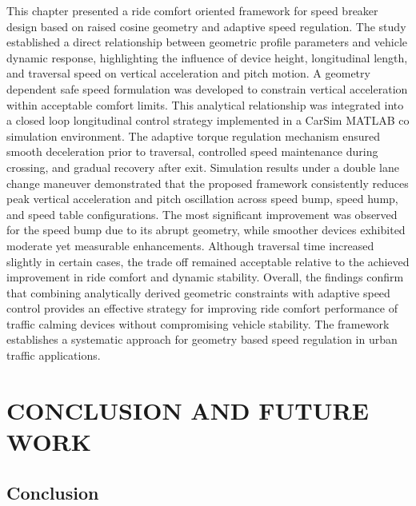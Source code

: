 \documentclass[a4paper,12pt,one side]{report}
\theoremstyle{definition}
\begin{document}
\begin{itemize}
This chapter presented a ride comfort oriented framework for speed breaker design based on raised cosine geometry and adaptive speed regulation. The study established a direct relationship between geometric profile parameters and vehicle dynamic response, highlighting the influence of device height, longitudinal length, and traversal speed on vertical acceleration and pitch motion. A geometry dependent safe speed formulation was developed to constrain vertical acceleration within acceptable comfort limits. This analytical relationship was integrated into a closed loop longitudinal control strategy implemented in a CarSim MATLAB co simulation environment. The adaptive torque regulation mechanism ensured smooth deceleration prior to traversal, controlled speed maintenance during crossing, and gradual recovery after exit. Simulation results under a double lane change maneuver demonstrated that the proposed framework consistently reduces peak vertical acceleration and pitch oscillation across speed bump, speed hump, and speed table configurations. The most significant improvement was observed for the speed bump due to its abrupt geometry, while smoother devices exhibited moderate yet measurable enhancements. Although traversal time increased slightly in certain cases, the trade off remained acceptable relative to the achieved improvement in ride comfort and dynamic stability. Overall, the findings confirm that combining analytically derived geometric constraints with adaptive speed control provides an effective strategy for improving ride comfort performance of traffic calming devices without compromising vehicle stability. The framework establishes a systematic approach for geometry based speed regulation in urban traffic applications.
\chapter{CONCLUSION AND FUTURE WORK}

\section{Conclusion}


\end{itemize}
\end{document}
